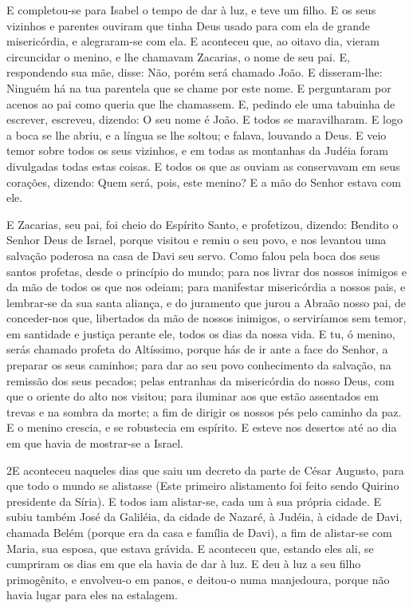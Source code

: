 E completou-se para Isabel o tempo de dar à luz, e teve um filho.
E os seus vizinhos e parentes ouviram que tinha Deus usado
para com ela de grande misericórdia, e alegraram-se com ela.
E aconteceu que, ao oitavo dia, vieram circuncidar o menino,
e lhe chamavam Zacarias, o nome de seu pai. E, respondendo
sua mãe, disse: Não, porém será chamado João. E disseram-lhe:
Ninguém há na tua parentela que se chame por este nome. E
perguntaram por acenos ao pai como queria que lhe chamassem.
E, pedindo ele uma tabuinha de escrever, escreveu, dizendo: O
seu nome é João. E todos se maravilharam. E logo a boca se
lhe abriu, e a língua se lhe soltou; e falava, louvando a Deus.
E veio temor sobre todos os seus vizinhos, e em todas as
montanhas da Judéia foram divulgadas todas estas coisas. E
todos os que as ouviam as conservavam em seus corações, dizendo:
Quem será, pois, este menino? E a mão do Senhor estava com ele.

E Zacarias, seu pai, foi cheio do Espírito Santo, e profetizou,
dizendo: Bendito o Senhor Deus de Israel, porque visitou e
remiu o seu povo, e nos levantou uma salvação poderosa na
casa de Davi seu servo. Como falou pela boca dos seus santos
profetas, desde o princípio do mundo; para nos livrar dos
nossos inimigos e da mão de todos os que nos odeiam; para
manifestar misericórdia a nossos pais, e lembrar-se da sua santa
aliança, e do juramento que jurou a Abraão nosso pai,
de conceder-nos que, libertados da mão de nossos inimigos, o
serviríamos sem temor, em santidade e justiça perante ele,
todos os dias da nossa vida. E tu, ó menino, serás chamado
profeta do Altíssimo, porque hás de ir ante a face do Senhor, a
preparar os seus caminhos; para dar ao seu povo conhecimento
da salvação, na remissão dos seus pecados; pelas entranhas da
misericórdia do nosso Deus, com que o oriente do alto nos visitou;
para iluminar aos que estão assentados em trevas e na sombra
da morte; a fim de dirigir os nossos pés pelo caminho da paz.
E o menino crescia, e se robustecia em espírito. E esteve nos
desertos até ao dia em que havia de mostrar-se a Israel.

\medskip

\lettrine{2} E aconteceu naqueles dias que saiu um decreto da
parte de César Augusto, para que todo o mundo se alistasse (Este
primeiro alistamento foi feito sendo Quirino presidente da Síria).
E todos iam alistar-se, cada um à sua própria cidade. E
subiu também José da Galiléia, da cidade de Nazaré, à Judéia, à
cidade de Davi, chamada Belém (porque era da casa e família de
Davi), a fim de alistar-se com Maria, sua esposa, que estava
grávida. E aconteceu que, estando eles ali, se cumpriram os dias
em que ela havia de dar à luz. E deu à luz a seu filho
primogênito, e envolveu-o em panos, e deitou-o numa manjedoura,
porque não havia lugar para eles na estalagem.

